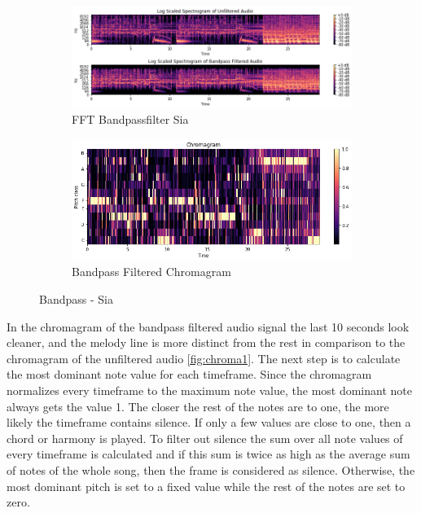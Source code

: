 \begin{figure}[htbp]
{{			\begin{subfigure}{.495\textwidth}
				\centering
				\includegraphics[scale=0.3]{Images/Chroma/siafft.png}
				\caption{FFT Bandpassfilter Sia}
				\label{siafft}
			\end{subfigure}%
			\begin{subfigure}{.495\textwidth}
				\centering
				\includegraphics[scale=0.3]{Images/Chroma/chroma_bp.png}
				\caption{Bandpass Filtered Chromagram}
				\label{pvfft}
			\end{subfigure}%
	}}
	\caption{Bandpass - Sia}
	\label{fig:sia2}
\end{figure}
In the chromagram of the bandpass filtered audio signal the last 10 seconds look cleaner, and the melody line is more distinct from the rest in comparison to the chromagram of the unfiltered audio \ref{fig:chroma1}.
The next step is to calculate the most dominant note value for each timeframe. Since the chromagram normalizes every timeframe to the maximum note value, the most dominant note always gets the value 1. The closer the rest of the notes are to one, the more likely the timeframe contains silence. If only a few values are close to one, then a chord or harmony is played. To filter out silence the sum over all note values of every timeframe is calculated and if this sum is twice as high as the average sum of notes of the whole song, then the frame is considered as silence. Otherwise, the most dominant pitch is set to a fixed value while the rest of the notes are set to zero.\\
